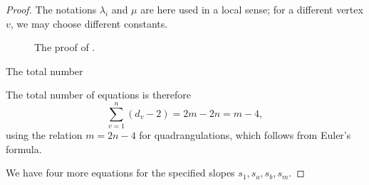 \begin{proof}
The notations
$\lambda_i$ and 
$\mu$ are here used in a local sense; for a different vertex $v$, we may
choose different constants.
\begin{figure}
     \caption{The proof of .}
  \end{figure}
The total number
 

  The total number of equations is therefore
\begin{equation}
  \label{eq:number-equations2}
  \sum_{v=1}^n(d_v-2) = 2m-2n = m-4,
\end{equation}
using the relation $m=2n-4$ for quadrangulations, which follows from
Euler's formula.


 We have four more equations for the specified slopes
$s_1, s_a, s_b, s_m$.


\end{proof}



